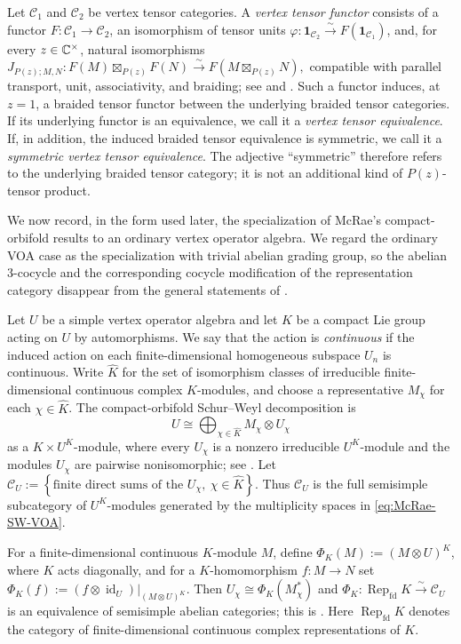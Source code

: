 \documentclass[10pt,a4paper]{amsart}
\numberwithin{equation}{section} \newtheorem{thm}{Theorem}[section] \newtheorem{lem}[thm]{Lemma} \newtheorem{ex}[thm]{Example} \newtheorem{prop}[thm]{Proposition} \newtheorem{cor}[thm]{Corollary} \newtheorem{defi}[thm]{Definition} \newtheorem{rmk}[thm]{Remark} \newtheorem{notation}[thm]{Notation}
\newcommand{\id}{\operatorname{id}}
\newcommand{\Rep}{\operatorname{Rep}}
\begin{document}
Let $\mathcal C_1$ and $\mathcal C_2$ be vertex tensor categories. A \emph{vertex tensor functor} consists of a functor $F:\mathcal C_1\to\mathcal C_2$, an isomorphism of tensor units \(\varphi:\mathbf 1_{\mathcal C_2}\overset{\sim}{\longrightarrow}F(\mathbf 1_{\mathcal C_1})\), and, for every $z\in\mathbb{C}^\times$, natural isomorphisms \(J_{P(z);M,N}:F(M)\boxtimes_{P(z)}F(N)\overset{\sim}{\longrightarrow}F(M\boxtimes_{P(z)}N),\) compatible with parallel transport, unit, associativity, and braiding; see \cite[\S2.1]{McRae} and \cite[\S3.6]{CKM}. Such a functor induces, at $z=1$, a braided tensor functor between the underlying braided tensor categories. If its underlying functor is an equivalence, we call it a \emph{vertex tensor equivalence}. If, in addition, the induced braided tensor equivalence is symmetric, we call it a \emph{symmetric vertex tensor equivalence}. The adjective ``symmetric'' therefore refers to the underlying braided tensor category; it is not an additional kind of $P(z)$-tensor product.

We now record, in the form used later, the specialization of McRae's compact-orbifold results to an ordinary vertex operator algebra. We regard the ordinary VOA case as the specialization with trivial abelian grading group, so the abelian $3$-cocycle and the corresponding cocycle modification of the representation category disappear from the general statements of \cite{McRae}.

Let $U$ be a simple vertex operator algebra and let $K$ be a compact Lie group acting on $U$ by automorphisms. We say that the action is \emph{continuous} if the induced action on each finite-dimensional homogeneous subspace $U_n$ is continuous. Write $\widehat K$ for the set of isomorphism classes of irreducible finite-dimensional continuous complex $K$-modules, and choose a representative $M_\chi$ for each $\chi\in\widehat K$. The compact-orbifold Schur--Weyl decomposition is
\begin{equation}\label{eq:McRae-SW-VOA}
 U\cong
 \bigoplus_{\chi\in\widehat K}M_\chi\otimes U_\chi
\end{equation}
as a $K\times U^K$-module, where every $U_\chi$ is a nonzero irreducible $U^K$-module and the modules $U_\chi$ are pairwise nonisomorphic; see \cite[\S3.1]{McRae}. Let \(\mathcal C_U:=\left\{\text{finite direct sums of the }U_\chi,\ \chi\in\widehat K\right\}.\) Thus $\mathcal C_U$ is the full semisimple subcategory of $U^K$-modules generated by the multiplicity spaces in \eqref{eq:McRae-SW-VOA}.

For a finite-dimensional continuous $K$-module $M$, define \(\Phi_K(M):=(M\otimes U)^K\), where $K$ acts diagonally, and for a $K$-homomorphism $f:M\to N$ set \(\Phi_K(f):=(f\otimes\id_U)\big|_{(M\otimes U)^K}.\) Then \(U_\chi\cong\Phi_K(M_\chi^*)\) and \(\Phi_K:\Rep_{\mathrm{fd}}K\overset{\sim}{\longrightarrow}\mathcal C_U\) is an equivalence of semisimple abelian categories; this is \cite[Proposition~3.5]{McRae}. Here $\Rep_{\mathrm{fd}}K$ denotes the category of finite-dimensional continuous complex representations of $K$.
\end{document}
